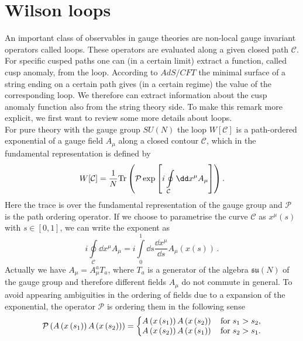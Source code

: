 \section{Wilson loops}
%
An important class of observables in gauge theories are non-local gauge invariant operators called  loops. These operators are evaluated along a given closed path $\mathcal{C}$. For specific cusped paths one can (in a certain limit) extract a function, called cusp anomaly, from the  loop. According to $AdS/CFT$ the minimal surface of a string ending on a certain path gives (in a certain regime) the value of the corresponding  loop. We therefore can extract information about the cusp anomaly function also from the string theory side. To make this remark more explicit, we first want to review some more details about  loops.\\
For pure  theory with the gauge group $SU(N)$ the  loop $W[\mathcal{C}]$ is a path-ordered exponential of a gauge field $A_{\mu}$ along a closed contour $\mathcal{C}$, which in the fundamental representation is defined by
%
%
\begin{equation}
W[\mathcal{C}] = \frac{1}{N}{\rm Tr} \left( \mathcal{P} \exp \left[ i \oint\limits_{\mathcal{C}} \dd x^{\mu}A_{\mu} \right] \right).
\end{equation}
%
%
Here the trace is over the fundamental representation of the gauge group and $\mathcal{P}$ is the path ordering operator. If we choose to parametrise the curve $\mathcal{C}$ as $x^{\mu}(s)$ with $s \in [0,1]$, we can write the exponent as
\begin{equation}
 i \oint\limits_{\mathcal{C}} \dd x^{\mu}A_{\mu} =  i \int\limits_{0}^{1} \dd s \frac{\dd x^{\mu}}{\dd s} A_{\mu}\left(x\left(s \right)\right)\,.
\end{equation}
Actually we have $A_{\mu}=A_{\mu}^{a}T_{a}$, where $T_{a}$ is a generator of the  algebra $\mathfrak{su}(N)$ of the gauge group and therefore different fields $A_{\mu}$ do not commute in general. To avoid appearing ambiguities in the ordering of fields due to a  expansion of the exponential, the operator $\mathcal{P}$ is ordering them in the following sense
\begin{equation}
\mathcal{P}\left( A\left(x\left(s_{1}\right)\right) A\left(x\left(s_{2}\right)\right) \right)
= \left\lbrace \begin{matrix}
A\left(x\left(s_{1}\right)\right) A\left(x\left(s_{2}\right)\right) \quad {\rm for} \; s_{1}>s_{2},  \\
A\left(x\left(s_{2}\right)\right) A\left(x\left(s_{1}\right)\right) \quad {\rm for} \; s_{2}>s_{1}.
\end{matrix} \right.
\end{equation}
%
%
%
